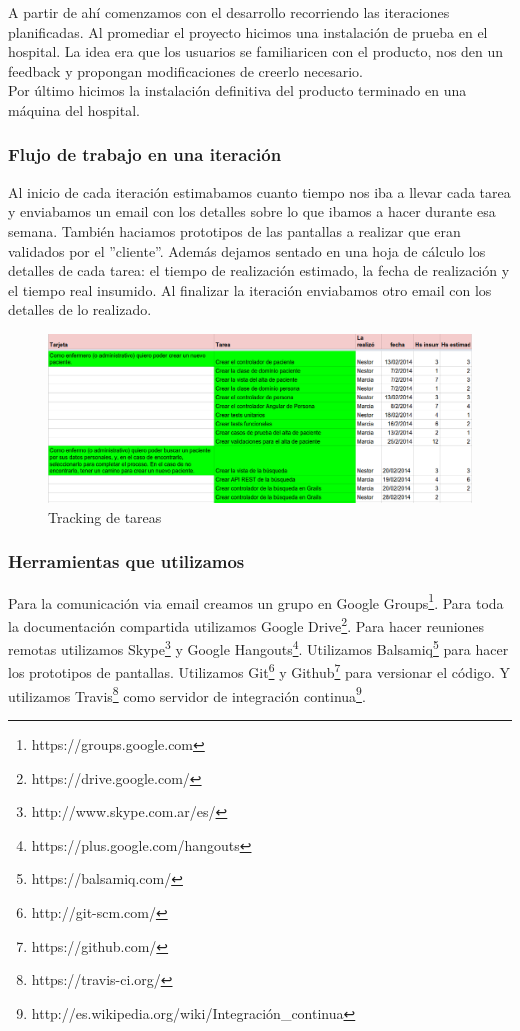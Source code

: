 A partir de ahí comenzamos con el desarrollo recorriendo las iteraciones planificadas. Al promediar el proyecto hicimos una instalación de prueba en el hospital. La idea era que los usuarios se familiaricen con el producto, nos den un feedback y propongan modificaciones de creerlo necesario.\\
Por último hicimos la instalación definitiva del producto terminado en una máquina del hospital.
\subsubsection{Flujo de trabajo en una iteración}
Al inicio de cada iteración estimabamos cuanto tiempo nos iba a llevar cada tarea y enviabamos un email con los detalles sobre lo que ibamos a hacer durante esa semana. También haciamos prototipos de las pantallas a realizar que eran validados por el ''cliente''. Además dejamos sentado en una hoja de cálculo los detalles de cada tarea: el tiempo de realización estimado, la fecha de realización y el tiempo real insumido. Al finalizar la iteración enviabamos otro email con los detalles de lo realizado.\\

\begin{figure}[h]
  \centerline{\includegraphics[width=1.2\textwidth]{tracking.png}}
  \caption{Tracking de tareas}
\end{figure}

\subsubsection{Herramientas que utilizamos}
Para la comunicación via email creamos un grupo en Google Groups\footnote{https://groups.google.com}.
Para toda la documentación compartida utilizamos Google Drive\footnote{https://drive.google.com/}. Para hacer reuniones remotas utilizamos Skype\footnote{http://www.skype.com.ar/es/} y Google Hangouts\footnote{https://plus.google.com/hangouts}. Utilizamos Balsamiq\footnote{https://balsamiq.com/} para hacer los prototipos de pantallas. Utilizamos Git\footnote{http://git-scm.com/} y Github\footnote{https://github.com/} para versionar el código. Y utilizamos Travis\footnote{https://travis-ci.org/} como servidor de integración continua\footnote{http://es.wikipedia.org/wiki/Integración\_continua}.
